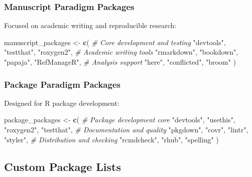 \documentclass[
]{article}
\newenvironment{Shaded}{\begin{snugshade}}{\end{snugshade}}
\newcommand{\CommentTok}[1]{\textcolor[rgb]{0.56,0.35,0.01}{\textit{#1}}}
\newcommand{\FunctionTok}[1]{\textcolor[rgb]{0.13,0.29,0.53}{\textbf{#1}}}
\newcommand{\NormalTok}[1]{#1}
\newcommand{\OtherTok}[1]{\textcolor[rgb]{0.56,0.35,0.01}{#1}}
\newcommand{\StringTok}[1]{\textcolor[rgb]{0.31,0.60,0.02}{#1}}
\begin{document}
\subsubsection{Manuscript Paradigm
Packages}\label{manuscript-paradigm-packages}

Focused on academic writing and reproducible research:

\begin{Shaded}
\begin{Highlighting}[]
\NormalTok{manuscript\_packages }\OtherTok{\textless{}{-}} \FunctionTok{c}\NormalTok{(}
  \CommentTok{\# Core development and testing}
  \StringTok{"devtools"}\NormalTok{, }\StringTok{"testthat"}\NormalTok{, }\StringTok{"roxygen2"}\NormalTok{,}
  \CommentTok{\# Academic writing tools}
  \StringTok{"rmarkdown"}\NormalTok{, }\StringTok{"bookdown"}\NormalTok{, }\StringTok{"papaja"}\NormalTok{, }\StringTok{"RefManageR"}\NormalTok{,}
  \CommentTok{\# Analysis support}
  \StringTok{"here"}\NormalTok{, }\StringTok{"conflicted"}\NormalTok{, }\StringTok{"broom"}
\NormalTok{)}
\end{Highlighting}
\end{Shaded}

\subsubsection{Package Paradigm
Packages}\label{package-paradigm-packages}

Designed for R package development:

\begin{Shaded}
\begin{Highlighting}[]
\NormalTok{package\_packages }\OtherTok{\textless{}{-}} \FunctionTok{c}\NormalTok{(}
  \CommentTok{\# Package development core}
  \StringTok{"devtools"}\NormalTok{, }\StringTok{"usethis"}\NormalTok{, }\StringTok{"roxygen2"}\NormalTok{, }\StringTok{"testthat"}\NormalTok{,}
  \CommentTok{\# Documentation and quality}
  \StringTok{"pkgdown"}\NormalTok{, }\StringTok{"covr"}\NormalTok{, }\StringTok{"lintr"}\NormalTok{, }\StringTok{"styler"}\NormalTok{,}
  \CommentTok{\# Distribution and checking}
  \StringTok{"rcmdcheck"}\NormalTok{, }\StringTok{"rhub"}\NormalTok{, }\StringTok{"spelling"}
\NormalTok{)}
\end{Highlighting}
\end{Shaded}

\subsection{Custom Package Lists}\label{custom-package-lists}
\end{document}
